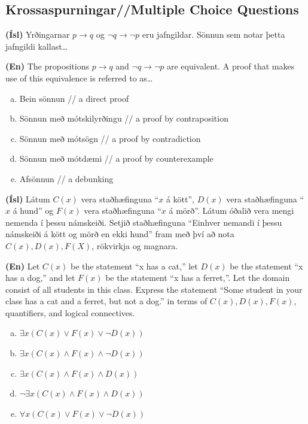 \documentclass[addpoints]{exam}
\begin{document}
\begin{questions}
        
\section{Krossaspurningar//Multiple Choice Questions}

\question[3] 

\textbf{(Ísl)} Yrðingarnar $p \to q$ og $\lnot q \to \lnot p$ eru jafngildar. Sönnun sem notar þetta jafngildi kallast\ldots

\textbf{(En)} The propositions $p \to q$ and $\lnot q \to \lnot p$ are equivalent. A proof that makes use of this equivalence is referred to as\ldots

\begin{enumerate}[a)]
    \item Bein sönnun // a direct proof
    \item Sönnun með mótskilyrðingu // a proof by contraposition %
    \item Sönnun með mótsögn // a proof by contradiction
    \item Sönnun með mótdæmi // a proof by counterexample
    \item Afsönnun // a debunking
\end{enumerate}

\question[3]
\textbf{(Ísl)} Látum $C(x)$ vera staðhæfinguna ``$x$ á kött'', $D(x)$ vera staðhæfinguna ``$x$ á hund'' og $F(x)$ vera staðhæfinguna ``$x$ á mörð''. Látum óðalið vera mengi nemenda í þessu námskeiði. Setjið staðhæfinguna ``Einhver nemandi í þessu námskeiði á kött og mörð en ekki hund'' fram með því að nota $C(x), D(x), F(X)$, rökvirkja og magnara.
    
\textbf{(En)} Let $C(x)$ be the statement ``x has a cat,'' let $D(x)$ be the statement ``x has a dog,'' and let $F(x)$ be the statement ``x has a ferret,''. Let the domain consist of all students in this class. Express the statement ``Some student in your class has a cat and a ferret, but not a dog.'' in terms of $C(x), D(x), F(x)$, quantifiers, and logical connectives.

\begin{enumerate}[a)]
    \item $\exists x(C(x) \lor F(x) \lor \lnot D(x))$
    \item $\exists x(C(x) \land F(x) \land \lnot D(x))$ %
    \item $\exists x(C(x) \land F(x) \land D(x))$
    \item $\lnot \exists x(C(x) \land F(x) \land D(x))$
    \item $\forall x(C(x) \lor F(x) \lor \lnot D(x))$
\end{enumerate}


\end{questions}
\end{document}
